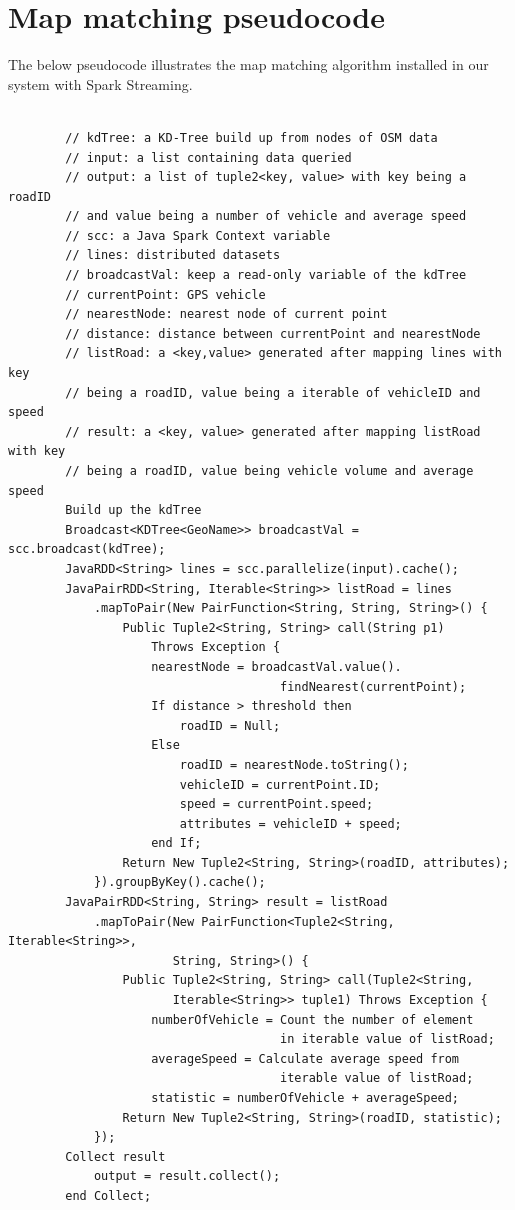 \documentclass{acm_proc_article-sp}
\begin{document}
\section{Map matching pseudocode} 
\medskip
\noindent
The below pseudocode illustrates the map matching algorithm installed in our system with Spark Streaming. 

\begin{verbatim}
		
		// kdTree: a KD-Tree build up from nodes of OSM data
		// input: a list containing data queried
		// output: a list of tuple2<key, value> with key being a roadID 
		// and value being a number of vehicle and average speed
		// scc: a Java Spark Context variable
		// lines: distributed datasets
		// broadcastVal: keep a read-only variable of the kdTree
		// currentPoint: GPS vehicle 
		// nearestNode: nearest node of current point
		// distance: distance between currentPoint and nearestNode
		// listRoad: a <key,value> generated after mapping lines with key
		// being a roadID, value being a iterable of vehicleID and speed
		// result: a <key, value> generated after mapping listRoad with key 
		// being a roadID, value being vehicle volume and average speed
		Build up the kdTree
		Broadcast<KDTree<GeoName>> broadcastVal = scc.broadcast(kdTree);
		JavaRDD<String> lines = scc.parallelize(input).cache();
		JavaPairRDD<String, Iterable<String>> listRoad = lines
		    .mapToPair(New PairFunction<String, String, String>() {
		        Public Tuple2<String, String> call(String p1) 
		            Throws Exception {
		            nearestNode = broadcastVal.value().
		                              findNearest(currentPoint);	
		            If distance > threshold then
		                roadID = Null;
		            Else 
		                roadID = nearestNode.toString();
		                vehicleID = currentPoint.ID;
		                speed = currentPoint.speed;
		                attributes = vehicleID + speed;
		            end If;
		        Return New Tuple2<String, String>(roadID, attributes);
		    }).groupByKey().cache();
		JavaPairRDD<String, String> result = listRoad
		    .mapToPair(New PairFunction<Tuple2<String, Iterable<String>>, 
		               String, String>() {
		        Public Tuple2<String, String> call(Tuple2<String,
		               Iterable<String>> tuple1) Throws Exception {
		            numberOfVehicle = Count the number of element
		                              in iterable value of listRoad;
		            averageSpeed = Calculate average speed from
		                              iterable value of listRoad;
		            statistic = numberOfVehicle + averageSpeed;
		        Return New Tuple2<String, String>(roadID, statistic);
		    });
		Collect result
		    output = result.collect();
		end Collect;

\end{verbatim}
%
\noindent
\end{document}
